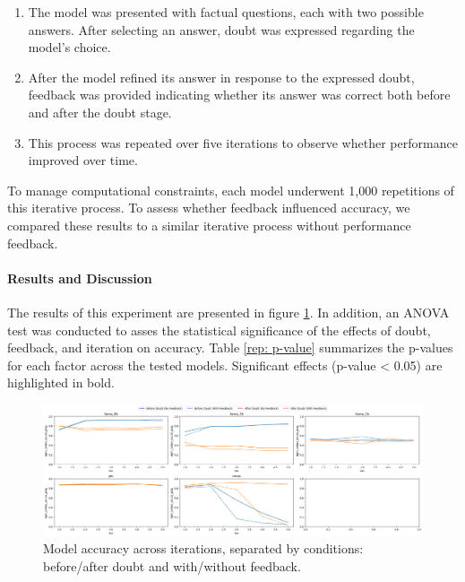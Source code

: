 \begin{enumerate}
    \item The model was presented with factual questions, each with two possible answers. After selecting an answer, doubt was expressed regarding the model's choice.
    \item After the model refined its answer in response to the expressed doubt, feedback was provided indicating whether its answer was correct both before and after the doubt stage.
    \item This process was repeated over five iterations to observe whether performance improved over time.
\end{enumerate}

To manage computational constraints, each model underwent 1,000 repetitions of this iterative process. To assess whether feedback influenced accuracy, we compared these results to a similar iterative process without performance feedback.

\paragraph{Results and Discussion}
The results of this experiment are presented in figure \ref{rep: graph}. In addition, an ANOVA test was conducted to asses the statistical significance of the effects of doubt, feedback, and iteration on accuracy. Table \ref{rep: p-value} summarizes the p-values for each factor across the tested models. Significant effects (p-value < 0.05) are highlighted in bold.

\begin{figure}[h!]
    \centering
    \includegraphics[width=\textwidth]{img/repeted_graph.png} %
    \caption{Model accuracy across iterations, separated by conditions: before/after doubt and with/without feedback.}
    \label{rep: graph}
\end{figure}

